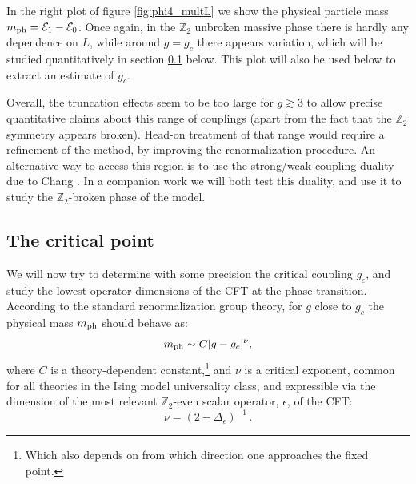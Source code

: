 \documentclass[11pt]{article}
\def\eps{\epsilon}
\newcommand{\beq}{\begin{equation}}
\newcommand{\eeq}{\end{equation}}
\def\bZ {\mathbb{Z}}
\def\bZ {\mathbb{Z}}
\def\phys{{\rm ph}}
\numberwithin{equation}{section}
\begin{document}
In the right plot of figure \ref{fig:phi4_multL} we show the physical particle mass $m_\phys = \mathcal{E}_1-\mathcal{E}_0$. Once again, in the $\bZ_2$ unbroken massive phase there is hardly any dependence on $L$, while around $g=g_c$ there appears variation, which will be studied quantitatively in section \ref{sec:fixed} below.
This plot will also be used below to extract an estimate of $g_c$. 

Overall, the truncation effects seem to be too large for $g\gtrsim 3$ to allow precise quantitative claims about this range of couplings (apart from the fact that the $\bZ_2$ symmetry appears broken). Head-on treatment of that range would require a refinement of the method, by improving the renormalization procedure. An alternative way to access this region is to use the strong/weak coupling duality due to Chang \cite{Chang:1976ek}. In a companion work \cite{Rychkov:2015vap} we will both test this duality, and use it to study the $\bZ_2$-broken phase of the model.

\subsection{The critical point}
\label{sec:fixed}
We will now try to determine with some precision the critical coupling $g_c$, and study the lowest operator dimensions of the CFT at the phase transition. According to the standard renormalization group theory, for $g$ close to $g_c$ the physical mass  $m_\phys$ should behave as:
\begin{equation}
\label{eq:critExp}
m_\phys \sim C |g - g_c|^\nu, 
\end{equation}
where $C$ is a theory-dependent constant,\footnote{Which also depends on from which direction one approaches the fixed point.} and $\nu$ is a critical exponent, common for all theories in the Ising model universality class, and expressible via the dimension of the most relevant $\bZ_2$-even scalar operator, $\eps$, of the CFT: 
\beq
\nu = (2-\Delta_\epsilon)^{-1}\,.
\eeq
\end{document}
